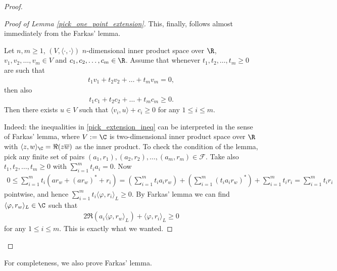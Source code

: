 \begin{proof}
\begin{proof}[Proof of Lemma \ref{pick_one_point_extension}]
		This, finally, follows almost immediately from the Farkas' lemma.
		\begin{lem}\label{farkas_lemma}
			Let $n, m \geq 1$, $(V, \langle \cdot, \cdot \rangle)$ $n$-dimensional inner product space over $\R$, $v_{1}, v_{2}, \ldots, v_{m} \in V$ and $c_{1}, c_{2}, \ldots, c_{m} \in \R$. Assume that whenever $t_{1}, t_{2}, \ldots, t_{m} \geq 0$ are such that
			\begin{align*}
				t_{1} v_{1} + t_{2} v_{2} + \ldots + t_{m} v_{m} = 0,
			\end{align*}
			then also
			\begin{align*}
				t_{1} c_{1} + t_{2} c_{2} + \ldots + t_{m} c_{m} \geq 0.
			\end{align*}
			Then there exists $u \in V$ such that $\langle v_{i}, u\rangle + c_{i} \geq 0$ for any $1 \leq i \leq m$.
		\end{lem}
		Indeed: the inequalities in \ref{pick_extension_ineq} can be interpreted in the sense of Farkas' lemma, where $V := \C$ is two-dimensional inner product space over $\R$ with $\langle z, w \rangle_{\C} = \Re(z \overline{w})$ as the inner product. To check the condition of the lemma, pick any finite set of pairs $(a_{1}, r_{1}), (a_{2}, r_{2}), \ldots, (a_{m}, r_{m}) \in \mathcal{F}$. Take also $t_{1}, t_{2}, \ldots, t_{m} \geq 0$ with $\sum_{i = 1}^{m} t_{i} a_{i} = 0$. Now
		\begin{align*}
			0 \leq \sum_{i = 1}^{m} t_{i} \left(ar_{w} + (ar_{w})^{*} + r_{i}\right) = \left(\sum_{i = 1}^{m} t_{i} a_{i} r_{w}\right) + \left(\sum_{i = 1}^{m} (t_{i} a_{i} r_{w})^{*}\right) + \sum_{i = 1}^{m} t_{i} r_{i} = \sum_{i = 1}^{m} t_{i} r_{i}
		\end{align*}
		pointwise, and hence $\sum_{i = 1}^{m} t_{i} \langle \varphi, r_{i} \rangle_{L} \geq 0$. By Farkas' lemma we can find $\langle \varphi, r_{w} \rangle_{L} \in \C$ such that
		\begin{align*}
			2 \Re(a_{i} \langle \varphi, r_{w} \rangle_{L}) + \langle \varphi, r_{i} \rangle_{L} \geq 0
		\end{align*}
		for any $1 \leq i \leq m$. This is exactly what we wanted.
	\end{proof}
\end{proof}

For completeness, we also prove Farkas' lemma.

